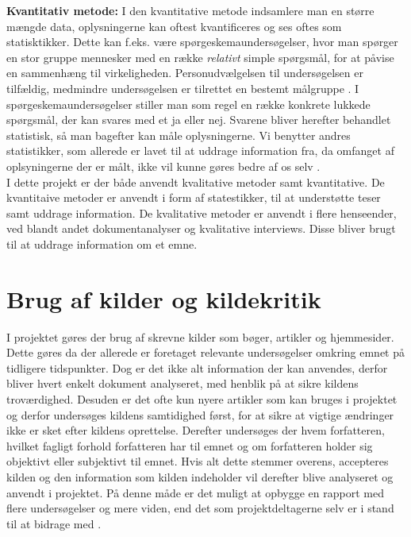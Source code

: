 \noindent\textbf{Kvantitativ metode:}
I den kvantitative metode indsamlere man en større mængde data, oplysningerne kan oftest kvantificeres og ses oftes som statisktikker. Dette kan f.eks. være spørgeskemaundersøgelser, hvor man spørger en stor gruppe mennesker med en række \textit{relativt} simple spørgsmål, for at påvise en sammenhæng til virkeligheden. Personudvælgelsen til undersøgelsen er tilfældig, medmindre undersøgelsen er tilrettet en bestemt målgruppe \citep{Kvan}. I spørgeskemaundersøgelser stiller man som regel en række konkrete lukkede spørgsmål, der kan svares med et ja eller nej. Svarene bliver herefter behandlet statistisk, så man bagefter kan måle oplysningerne. Vi benytter andres statistikker, som allerede er lavet til at uddrage information fra, da omfanget af oplsyningerne der er målt, ikke vil kunne gøres bedre af os selv \citep{Gymportalen}.\\ 

\noindent I dette projekt er der både anvendt kvalitative metoder samt kvantitative. De kvantitaive metoder er anvendt i form af statestikker, til at understøtte teser samt uddrage information.
De kvalitative metoder er anvendt i flere henseender, ved blandt andet dokumentanalyser og kvalitative interviews. Disse bliver brugt til at uddrage information om et emne.



\section{Brug af kilder og kildekritik}
I projektet gøres der brug af skrevne kilder som bøger, artikler og hjemmesider. Dette gøres da der allerede er foretaget relevante undersøgelser omkring emnet på tidligere tidspunkter. Dog er det ikke alt information der kan anvendes, derfor bliver hvert enkelt dokument analyseret, med henblik på at sikre kildens troværdighed. Desuden er det ofte kun nyere artikler som kan bruges i projektet og derfor undersøges kildens samtidighed først, for at sikre at vigtige ændringer ikke er sket efter kildens oprettelse. Derefter undersøges der hvem forfatteren, hvilket fagligt forhold forfatteren har til emnet og om forfatteren holder sig objektivt eller subjektivt til emnet. Hvis alt dette stemmer overens, accepteres kilden og den information som kilden indeholder vil derefter blive analyseret og anvendt i projektet. På denne måde er det muligt at opbygge en rapport med flere undersøgelser og mere viden, end det som projektdeltagerne selv er i stand til at bidrage med \citep{Kildekritik}.

